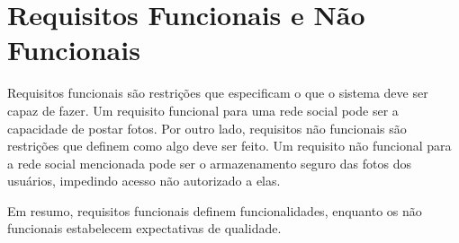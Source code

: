 \section{Requisitos Funcionais e Não Funcionais}

Requisitos funcionais são restrições que especificam o que o sistema deve ser capaz de fazer. Um requisito funcional para uma rede social pode ser a capacidade de postar fotos. Por outro lado, requisitos não funcionais são restrições que definem como algo deve ser feito. Um requisito não funcional para a rede social mencionada pode ser o armazenamento seguro das fotos dos usuários, impedindo acesso não autorizado a elas.

Em resumo, requisitos funcionais definem funcionalidades, enquanto os não funcionais estabelecem expectativas de qualidade.
